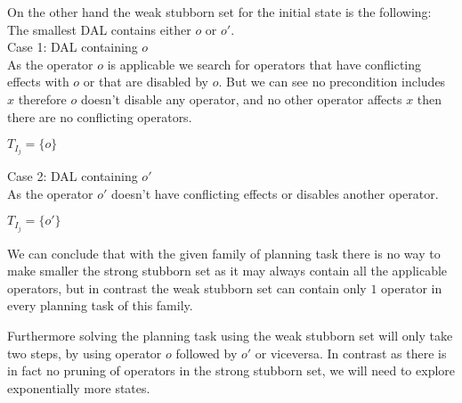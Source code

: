 \documentclass[11pt,a4paper]{article}
\begin{document}
On the other hand the weak stubborn set for the initial state is the following:\\
The smallest DAL contains either $o$ or $o'$.\\
Case 1: DAL containing ${o}$\\
As the operator $o$ is applicable we search for operators that have conflicting effects with $o$ or that are disabled by $o$. But we can see no precondition includes $x$ therefore $o$ doesn't disable any operator, and no other operator affects $x$ then there are no conflicting operators.
\begin{center}
	$T_{I_j} = \{o\}$
\end{center}
Case 2: DAL containing ${o'}$\\
As the operator $o'$ doesn't have conflicting effects or disables another operator. 
\begin{center}
	$T_{I_j} = \{o'\}$
\end{center}

We can conclude that with the given family of planning task there is no way to make smaller the strong stubborn set as it may always contain all the applicable operators, but in contrast the weak stubborn set can contain only $1$ operator in every planning task of this family.

Furthermore solving the planning task using the weak stubborn set will only take two steps, by using operator $o$ followed by $o'$ or viceversa. In contrast as there is in fact no pruning of operators in the strong stubborn set, we will need to explore exponentially more states. 
\end{document}
